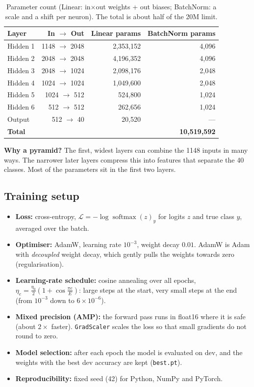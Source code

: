 \documentclass[11pt,a4paper]{article}
\begin{document}
\begin{table}[H]
\centering
\small
\begin{tabular}{lrrr}
\toprule
Layer & In $\rightarrow$ Out & Linear params & BatchNorm params \\
\midrule
Hidden 1 & 1148 $\rightarrow$ 2048 & 2,353,152 & 4,096 \\
Hidden 2 & 2048 $\rightarrow$ 2048 & 4,196,352 & 4,096 \\
Hidden 3 & 2048 $\rightarrow$ 1024 & 2,098,176 & 2,048 \\
Hidden 4 & 1024 $\rightarrow$ 1024 & 1,049,600 & 2,048 \\
Hidden 5 & 1024 $\rightarrow$ 512  &   524,800 & 1,024 \\
Hidden 6 & 512  $\rightarrow$ 512  &   262,656 & 1,024 \\
Output   & 512  $\rightarrow$ 40   &    20,520 & --- \\
\midrule
\multicolumn{2}{l}{\textbf{Total}} & \multicolumn{2}{r}{\textbf{10,519,592}} \\
\bottomrule
\end{tabular}
\caption{Parameter count (Linear: in$\times$out weights + out biases; BatchNorm: a scale and a shift per
neuron). The total is about half of the 20M limit.}
\end{table}

\textbf{Why a pyramid?} The first, widest layers can combine the 1148 inputs in many ways. The narrower
later layers compress this into features that separate the 40 classes. Most of the parameters sit in
the first two layers.

\subsection{Training setup}\label{sec:training}
\begin{itemize}\itemsep1pt
  \item \textbf{Loss:} cross-entropy, $\mathcal{L} = -\log \operatorname{softmax}(z)_{y}$ for logits $z$
        and true class $y$, averaged over the batch.
  \item \textbf{Optimiser:} AdamW, learning rate $10^{-3}$, weight decay $0.01$. AdamW is Adam with
        \emph{decoupled} weight decay, which gently pulls the weights towards zero (regularisation).
  \item \textbf{Learning-rate schedule:} cosine annealing over all epochs,
        $\eta_e = \tfrac{\eta_0}{2}\left(1+\cos\frac{\pi e}{E}\right)$: large steps at the start, very
        small steps at the end (from $10^{-3}$ down to $6\times10^{-6}$).
  \item \textbf{Mixed precision (AMP):} the forward pass runs in float16 where it is safe (about $2\times$
        faster). \texttt{GradScaler} scales the loss so that small gradients do not round to zero.
  \item \textbf{Model selection:} after each epoch the model is evaluated on dev, and the weights with the
        best dev accuracy are kept (\texttt{best.pt}).
  \item \textbf{Reproducibility:} fixed seed (42) for Python, NumPy and PyTorch.
\end{itemize}
\end{document}
